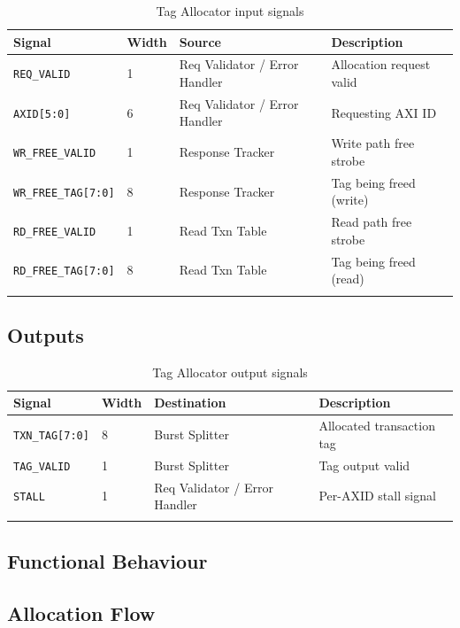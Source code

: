 \begin{longtable}{llll}
\toprule
\textbf{Signal} & \textbf{Width} & \textbf{Source} & \textbf{Description} \\
\midrule
\texttt{REQ\_VALID}       & 1 & Req Validator / Error Handler & Allocation request valid \\
\texttt{AXID[5:0]}        & 6 & Req Validator / Error Handler & Requesting AXI ID \\
\texttt{WR\_FREE\_VALID}  & 1 & Response Tracker              & Write path free strobe \\
\texttt{WR\_FREE\_TAG[7:0]} & 8 & Response Tracker            & Tag being freed (write) \\
\texttt{RD\_FREE\_VALID}  & 1 & Read Txn Table                & Read path free strobe \\
\texttt{RD\_FREE\_TAG[7:0]} & 8 & Read Txn Table              & Tag being freed (read) \\
\bottomrule
\caption{Tag Allocator input signals}
\end{longtable}

\subsection{Outputs}

\begin{longtable}{llll}
\toprule
\textbf{Signal} & \textbf{Width} & \textbf{Destination} & \textbf{Description} \\
\midrule
\texttt{TXN\_TAG[7:0]} & 8 & Burst Splitter                & Allocated transaction tag \\
\texttt{TAG\_VALID}    & 1 & Burst Splitter                & Tag output valid \\
\texttt{STALL}         & 1 & Req Validator / Error Handler & Per-AXID stall signal \\
\bottomrule
\caption{Tag Allocator output signals}
\end{longtable}

\subsection{Functional Behaviour}

\subsection{Allocation Flow}

